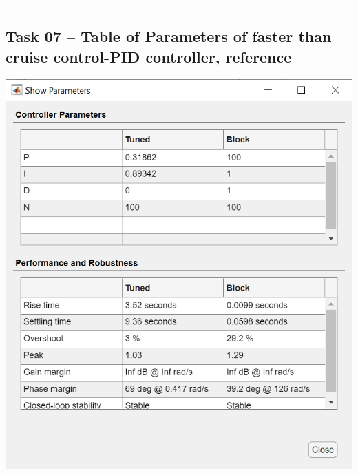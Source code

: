 \documentclass[12pt]{article}
\def\hr{{\par\noindent\rule{\textwidth}{0.4pt}}}
\begin{document}
\hr{}

\subsection{Task 07 -- Table of Parameters of faster than cruise control-PID controller, reference}
\includegraphics[width=\linewidth]{img/task07_035_cruise_control_faster_table.png}
\end{document}
